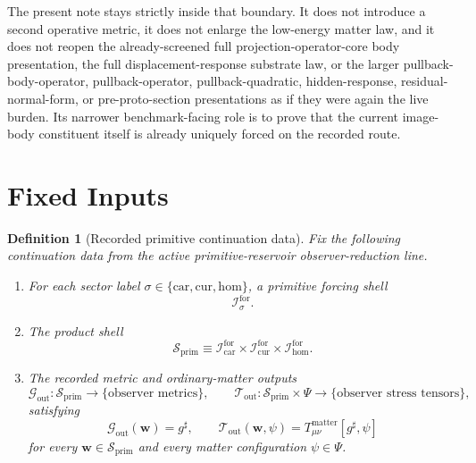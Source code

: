 \documentclass[11pt]{article}
\newcommand{\CompletedMetric}{g^{\sharp}}
\newcommand{\MatterSpace}{\Psi}
\newcommand{\Car}{\mathrm{car}}
\newcommand{\Cur}{\mathrm{cur}}
\newcommand{\Hom}{\mathrm{hom}}
\newcommand{\ForSpace}[1]{\mathcal I_{#1}^{\mathrm{for}}}
\newcommand{\PrimShell}{\mathcal S_{\mathrm{prim}}}
\newcommand{\MetricOut}{\mathscr G_{\mathrm{out}}}
\newcommand{\MatterOut}{\mathscr T_{\mathrm{out}}}
\newtheorem{definition}{Definition}
\begin{document}
The present note stays strictly inside that boundary. It does not introduce a second operative metric, it does not enlarge the low-energy matter law, and it does not reopen the already-screened full projection-operator-core body presentation, the full displacement-response substrate law, or the larger pullback-body-operator, pullback-operator, pullback-quadratic, hidden-response, residual-normal-form, or pre-proto-section presentations as if they were again the live burden. Its narrower benchmark-facing role is to prove that the current image-body constituent itself is already uniquely forced on the recorded route.

\section{Fixed Inputs}

\begin{definition}[Recorded primitive continuation data]
\label{def:fixed}
Fix the following continuation data from the active primitive-reservoir observer-reduction line.
\begin{enumerate}
    \item For each sector label \(\sigma\in\{\Car,\Cur,\Hom\}\), a primitive forcing shell
    \[
    \ForSpace{\sigma}.
    \]
    \item The product shell
    \[
    \PrimShell
    \equiv
    \ForSpace{\Car}\times \ForSpace{\Cur}\times \ForSpace{\Hom}.
    \]
    \item The recorded metric and ordinary-matter outputs
    \[
    \MetricOut:\PrimShell\to\{\text{observer metrics}\},
    \qquad
    \MatterOut:\PrimShell\times\MatterSpace\to\{\text{observer stress tensors}\},
    \]
    satisfying
    \begin{equation}
    \MetricOut(\mathbf w)=\CompletedMetric,
    \qquad
    \MatterOut(\mathbf w,\psi)
    =
    T_{\mu\nu}^{\mathrm{matter}}[\CompletedMetric,\psi]
    \label{eq:fixedoutputs}
    \end{equation}
    for every \(\mathbf w\in\PrimShell\) and every matter configuration \(\psi\in\MatterSpace\).
\end{enumerate}
\end{definition}
\end{document}
